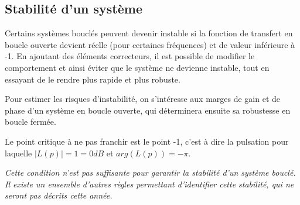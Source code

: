 \documentclass[a4paper,french]{paper}
\begin{document}
\newpage
\subsection*{Stabilité d'un système}

Certains systèmes bouclés peuvent devenir instable si la fonction de transfert en boucle ouverte devient réelle (pour certaines fréquences) et de valeur inférieure à -1. En ajoutant des éléments correcteurs, il est possible de modifier le comportement et ainsi éviter que le système ne devienne instable, tout en essayant de le rendre plus rapide et plus robuste. 

Pour estimer les risques d'instabilité, on s'intéresse aux marges de gain et de phase d'un système en boucle ouverte, qui déterminera ensuite sa robustesse en boucle fermée.

Le point critique à ne pas franchir est le point -1, c'est à dire la pulsation pour laquelle $\lvert L(p) \rvert = 1 = 0dB$ et $arg(L(p)) = -\pi$. 

\qquad

\textit{Cette condition n'est pas suffisante pour garantir la stabilité d'un système bouclé. Il existe un ensemble d'autres règles permettant d'identifier cette stabilité, qui ne seront pas décrits cette année.}



\end{document}

